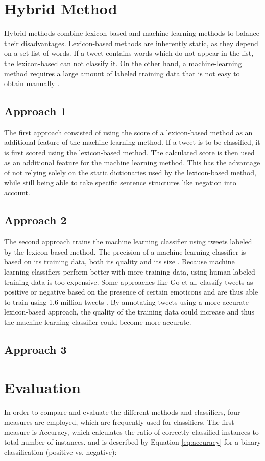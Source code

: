 \section{Hybrid Method}
Hybrid methods combine lexicon-based and machine-learning methods to balance their disadvantages. Lexicon-based methods are inherently static, as they depend on a set list of words. If a tweet contains words which do not appear in the list, the lexicon-based can not classify it. On the other hand, a machine-learning method requires a large amount of labeled training data that is not easy to obtain manually \cite{DBLP:journals/csur/GiachanouC16}.

\subsection{Approach 1}
The first approach consisted of using the score of a lexicon-based method as an additional feature of the machine learning method. If a tweet is to be classified, it is first scored using the lexicon-based method. The calculated score is then used as an additional feature for the machine learning method. This has the advantage of not relying solely on the static dictionaries used by the lexicon-based method, while still being able to take specific sentence structures like negation into account.
\subsection{Approach 2}
The second approach trains the machine learning classifier using tweets labeled by the lexicon-based method. The precision of a machine learning classifier is based on its training data, both its quality and its size \cite{DBLP:journals/csur/GiachanouC16}. Because machine learning classifiers perform better with more training data, using human-labeled training data is too expensive. Some approaches like Go et al. classify tweets as positive or negative based on the presence of certain emoticons and are thus able to train using 1.6 million tweets \cite{GoBHaHua2009}. By annotating tweets using a more accurate lexicon-based approach, the quality of the training data could increase and thus the machine learning classifier could become more accurate.
\subsection{Approach 3}


\section{Evaluation}
In order to compare and evaluate the different methods and classifiers, four measures are employed, which are frequently used for classifiers. The first measure is Accuracy, which calculates the ratio of correctly classified instances to total number of instances. and is described by Equation \eqref{eq:accuracy} for a binary classification (positive vs. negative):

